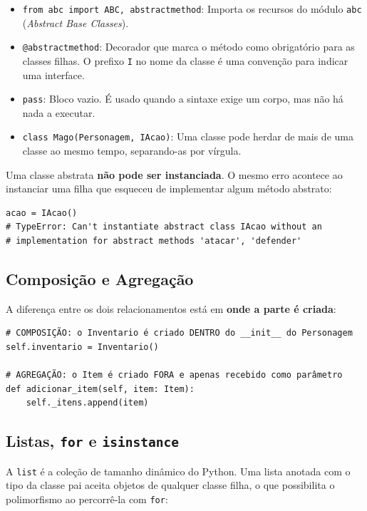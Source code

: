 \begin{itemize}
    \item \texttt{from abc import ABC, abstractmethod}: Importa os recursos do módulo
    \texttt{abc} (\textit{Abstract Base Classes}).

    \item \texttt{@abstractmethod}: Decorador que marca o método como obrigatório para as
    classes filhas. O prefixo \texttt{I} no nome da classe é uma convenção para indicar uma
    interface.

    \item \texttt{pass}: Bloco vazio. É usado quando a sintaxe exige um corpo, mas não há nada
    a executar.

    \item \texttt{class Mago(Personagem, IAcao)}: Uma classe pode herdar de mais de uma classe
    ao mesmo tempo, separando-as por vírgula.
\end{itemize}

Uma classe abstrata \textbf{não pode ser instanciada}. O mesmo erro acontece ao instanciar uma
filha que esqueceu de implementar algum método abstrato:

\begin{lstlisting}[style=python]
acao = IAcao()
# TypeError: Can't instantiate abstract class IAcao without an
# implementation for abstract methods 'atacar', 'defender'
\end{lstlisting}

\subsection{Composição e Agregação}

A diferença entre os dois relacionamentos está em \textbf{onde a parte é criada}:

\begin{lstlisting}[style=python]
# COMPOSIÇÃO: o Inventario é criado DENTRO do __init__ do Personagem
self.inventario = Inventario()

# AGREGAÇÃO: o Item é criado FORA e apenas recebido como parâmetro
def adicionar_item(self, item: Item):
    self._itens.append(item)
\end{lstlisting}

\subsection{Listas, \texttt{for} e \texttt{isinstance}}

A \texttt{list} é a coleção de tamanho dinâmico do Python. Uma lista anotada com o tipo da
classe pai aceita objetos de qualquer classe filha, o que possibilita o polimorfismo ao
percorrê-la com \texttt{for}:

